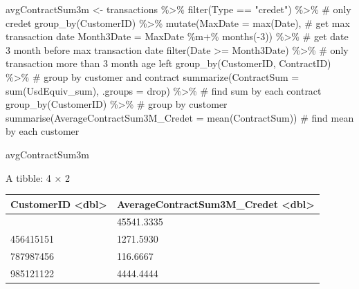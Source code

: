 \documentclass[
  letterpaper,
  DIV=11,
  numbers=noendperiod]{scrreprt}
\newenvironment{Shaded}{\begin{snugshade}}{\end{snugshade}}
\newcommand{\AttributeTok}[1]{\textcolor[rgb]{0.40,0.45,0.13}{#1}}
\newcommand{\CommentTok}[1]{\textcolor[rgb]{0.37,0.37,0.37}{#1}}
\newcommand{\DecValTok}[1]{\textcolor[rgb]{0.68,0.00,0.00}{#1}}
\newcommand{\FunctionTok}[1]{\textcolor[rgb]{0.28,0.35,0.67}{#1}}
\newcommand{\NormalTok}[1]{\textcolor[rgb]{0.00,0.23,0.31}{#1}}
\newcommand{\OtherTok}[1]{\textcolor[rgb]{0.00,0.23,0.31}{#1}}
\newcommand{\SpecialCharTok}[1]{\textcolor[rgb]{0.37,0.37,0.37}{#1}}
\newcommand{\StringTok}[1]{\textcolor[rgb]{0.13,0.47,0.30}{#1}}
\begin{document}
\begin{Shaded}
\begin{Highlighting}[]
\NormalTok{avgContractSum3m }\OtherTok{\textless{}{-}}\NormalTok{ transactions }\SpecialCharTok{\%\textgreater{}\%}
        \FunctionTok{filter}\NormalTok{(Type }\SpecialCharTok{==} \StringTok{"credet"}\NormalTok{) }\SpecialCharTok{\%\textgreater{}\%} \CommentTok{\# only credet}
        \FunctionTok{group\_by}\NormalTok{(CustomerID) }\SpecialCharTok{\%\textgreater{}\%} 
        \FunctionTok{mutate}\NormalTok{(}\AttributeTok{MaxDate =} \FunctionTok{max}\NormalTok{(Date), }\CommentTok{\# get max transaction date}
               \AttributeTok{Month3Date =}\NormalTok{ MaxDate }\SpecialCharTok{\%m+\%} \FunctionTok{months}\NormalTok{(}\SpecialCharTok{{-}}\DecValTok{3}\NormalTok{)) }\SpecialCharTok{\%\textgreater{}\%} \CommentTok{\# get date 3 month before max transaction date}
       \FunctionTok{filter}\NormalTok{(Date }\SpecialCharTok{\textgreater{}=}\NormalTok{ Month3Date) }\SpecialCharTok{\%\textgreater{}\%} \CommentTok{\# only transaction more than 3 month age left}
       \FunctionTok{group\_by}\NormalTok{(CustomerID, ContractID) }\SpecialCharTok{\%\textgreater{}\%} \CommentTok{\# group by customer and contract}
       \FunctionTok{summarize}\NormalTok{(}\AttributeTok{ContractSum =} \FunctionTok{sum}\NormalTok{(UsdEquiv\_sum), }\AttributeTok{.groups =} \StringTok{\textquotesingle{}drop\textquotesingle{}}\NormalTok{) }\SpecialCharTok{\%\textgreater{}\%} \CommentTok{\# find sum by each contract}
       \FunctionTok{group\_by}\NormalTok{(CustomerID) }\SpecialCharTok{\%\textgreater{}\%} \CommentTok{\# group by customer}
       \FunctionTok{summarise}\NormalTok{(}\AttributeTok{AverageContractSum3M\_Credet =} \FunctionTok{mean}\NormalTok{(ContractSum)) }\CommentTok{\# find mean by each customer}

\NormalTok{avgContractSum3m}
\end{Highlighting}
\end{Shaded}

A tibble: 4 × 2

\begin{longtable}[]{@{}ll@{}}
\toprule\noalign{}
CustomerID \textless dbl\textgreater{} & AverageContractSum3M\_Credet
\textless dbl\textgreater{} \\
\midrule\noalign{}
\endhead
\bottomrule\noalign{}
\endlastfoot
215454555 & 45541.3335 \\
456415151 & 1271.5930 \\
787987456 & 116.6667 \\
985121122 & 4444.4444 \\
\end{longtable}
\end{document}
